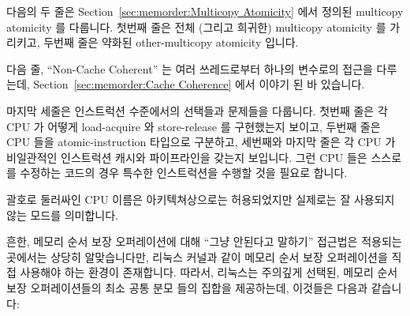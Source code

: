 다음의 두 줄은
Section~\ref{sec:memorder:Multicopy Atomicity} 에서 정의된 multicopy atomicity
를 다룹니다.
첫번째 줄은 전체 (그리고 희귀한) multicopy atomicity 를 가리키고, 두번째 줄은
약화된 other-multicopy atomicity 입니다.

다음 줄, ``Non-Cache Coherent'' 는 여러 쓰레드로부터 하나의 변수로의 접근을
다루는데,
Section~\ref{sec:memorder:Cache Coherence} 에서 이야기 된 바 있습니다.

마지막 세줄은 인스트럭션 수준에서의 선택들과 문제들을 다룹니다.
첫번째 줄은 각 CPU 가 어떻게 load-acquire 와 store-release 를 구현했는지
보이고, 두번째 줄은 CPU 들을 atomic-instruction 타입으로 구분하고, 세번째와
마지막 줄은 각 CPU 가 비일관적인 인스트럭션 캐시와 파이프라인을 갖는지
보입니다.
그런 CPU 들은 스스로를 수정하는 코드의 경우 특수한 인스트럭션을 수행할 것을
필요로 합니다.

괄호로 둘러싸인 CPU 이름은 아키텍쳐상으로는 허용되었지만 실제로는 잘 사용되지
않는 모드를 의미합니다.

흔한, 메모리 순서 보장 오퍼레이션에 대해 ``그냥 안된다고 말하기'' 접근법은
적용되는 곳에서는 상당히 알맞습니다만, 리눅스 커널과 같이 메모리 순서 보장
오퍼레이션을 직접 사용해야 하는 환경이 존재합니다.
따라서, 리눅스는 주의깊게 선택된, 메모리 순서 보장 오퍼레이션들의 최소 공통
분모 들의 집합을 제공하는데, 이것들은 다음과 같습니다:
\iffalse


